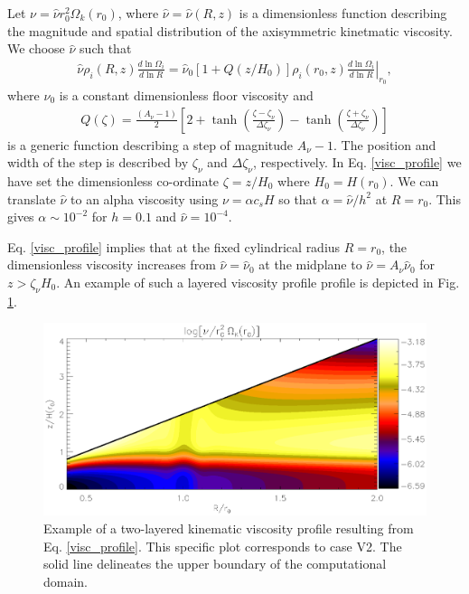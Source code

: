 Let $\nu = \hat{\nu}r_0^2\Omega_k(r_0)$, where
$\hat{\nu}=\hat{\nu}(R,z)$ is a dimensionless function describing
the magnitude and spatial distribution of the axisymmetric kinetmatic
viscosity. We choose $\hat{\nu}$ such that   
\begin{align}\label{visc_profile}
  \hat{\nu}\rho_i(R,z)\frac{d\ln{\Omega_i}}{d\ln{R}} =
  \hat{\nu}_0\left[1+Q(z/H_0)\right]\rho_i(r_0,z)\left.\frac{d\ln{\Omega_i}}{d\ln{R}}\right|_{r_0}, 
\end{align}
where $\nu_0$ is a constant dimensionless floor viscosity and   
\begin{align}\label{step}
  Q(\zeta) = \frac{\left(A_\nu - 1\right)}{2}
  \left[  2 + \tanh{\left(\frac{\zeta - \zeta_\nu}{\Delta\zeta_\nu}\right)}
    - \tanh{\left(\frac{\zeta +
        \zeta_\nu}{\Delta\zeta_\nu}\right)}\right]
\end{align}
is a generic function describing a step of magnitude
$A_\nu-1$. The position and width of the step is described by
$\zeta_\nu$ and $\Delta\zeta_\nu$, respectively. 
In Eq. \ref{visc_profile} we have set the dimensionless co-ordinate
$\zeta=z/H_0$ where $H_0=H(r_0)$. %
We can translate $\hat{\nu}$ to an alpha viscosity 
using $\nu = \alpha c_s H$ \citep{shakura73} so that $\alpha =
\hat{\nu}/h^2$ at $R=r_0$.  This gives $\alpha\sim 10^{-2}$ for
$h=0.1$ and $\hat{\nu}=10^{-4}$. 

Eq. \ref{visc_profile} implies that at the fixed cylindrical radius
$R=r_0$, the dimensionless viscosity increases from $\hat{\nu} =
\hat{\nu}_0$ at the midplane to $\hat{\nu} = A_\nu\hat{\nu}_0$ for
$z > \zeta_\nu H_0$. An example of such a layered viscosity profile
profile is depicted in Fig. \ref{visc2d}. 
 

\begin{figure}
  \centering
  \includegraphics[width=\linewidth]{figures/pdisk_visc2d_layer2}
  \caption{Example of a two-layered kinematic viscosity profile
    resulting from Eq. \ref{visc_profile}. This specific plot
    corresponds to case V2. The solid line
    delineates the upper boundary of the computational domain.
    \label{visc2d}}
\end{figure}


